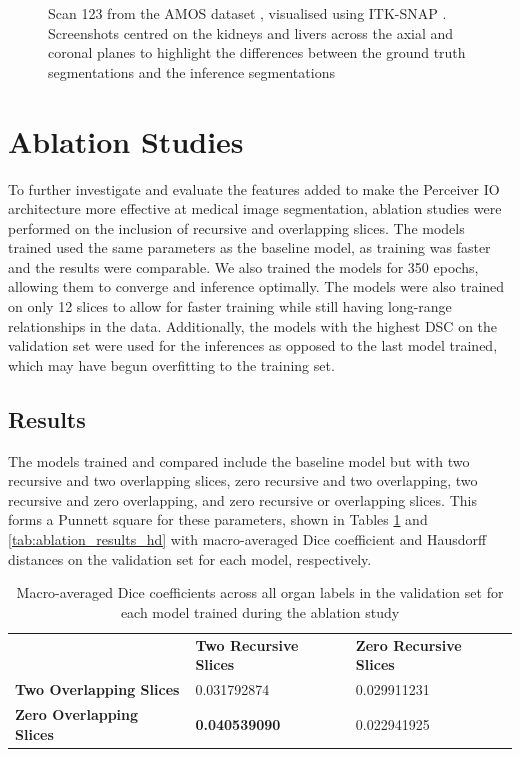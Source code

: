 \documentclass{l4proj}
\begin{document}
\begin{figure}[htb]
    \caption{Scan 123 from the AMOS dataset \citep{ji2022amos}, visualised using ITK-SNAP \citep{itksnap}. Screenshots centred on the kidneys and livers across the axial and coronal planes to highlight the differences between the ground truth segmentations and the inference segmentations} \label{fig:full_scan_example_results}
\end{figure}

\section{Ablation Studies} \label{sec:ablation_studies}

To further investigate and evaluate the features added to make the Perceiver IO architecture more effective at medical image segmentation, ablation studies were performed on the inclusion of recursive and overlapping slices. The models trained used the same parameters as the baseline model, as training was faster and the results were comparable. We also trained the models for 350 epochs, allowing them to converge and inference optimally. The models were also trained on only 12 slices to allow for faster training while still having long-range relationships in the data. Additionally, the models with the highest DSC on the validation set were used for the inferences as opposed to the last model trained, which may have begun overfitting to the training set.

\subsection{Results}

The models trained and compared include the baseline model but with two recursive and two overlapping slices, zero recursive and two overlapping, two recursive and zero overlapping, and zero recursive or overlapping slices. This forms a Punnett square for these parameters, shown in Tables \ref{tab:ablation_results_dsc} and \ref{tab:ablation_results_hd} with macro-averaged Dice coefficient and Hausdorff distances on the validation set for each model, respectively.

\begin{table}[]
\caption{Macro-averaged Dice coefficients across all organ labels in the validation set for each model trained during the ablation study} \label{tab:ablation_results_dsc}
\begin{tabular}{lll}
\textbf{}                        & \textbf{Two Recursive Slices} & \textbf{Zero Recursive Slices} \\
\textbf{Two Overlapping Slices}  & \num{0.031792874}                              & \num{0.029911231}                               \\
\textbf{Zero Overlapping Slices} & \textbf{\num{0.040539090}}                              & \num{0.022941925}                              
\end{tabular}
\end{table}
\end{document}
